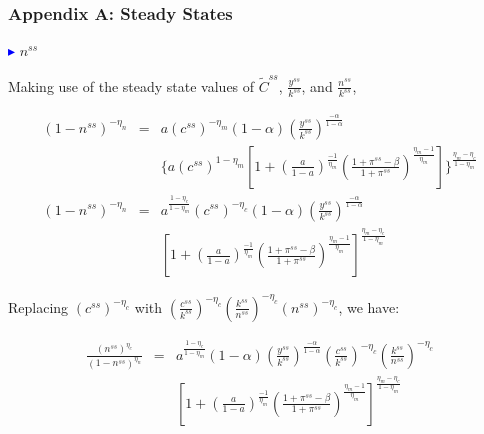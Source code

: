 \begin{frame}
\frametitle{Appendix A: Steady States} \vskip 0.1in

\textcolor{blue}{$\blacktriangleright$} $n^{ss}$\\

{\scriptsize{
Making use of the steady state values of
$\tilde{C}^{ss}$, $\frac{y^{ss}}{k^{ss}}$, and
$\frac{n^{ss}}{k^{ss}}$,


\begin{eqnarray}
(1-n^{ss})^{-\eta_{n}} &=& a
(c^{ss})^{-\eta_{m}}(1-\alpha)(\frac{y^{ss}}{k^{ss}})^{\frac{-\alpha}{1-\alpha}}
\nonumber\\&& \{a (c^{ss})^{1-\eta_{m}}[1+
(\frac{a}{1-a})^{\frac{-1}{\eta_{m}}}
(\frac{1+\pi^{ss}-\beta}{1+\pi^{ss}})^{\frac{\eta_{m}-1}{\eta_{m}}}]
\}^{\frac{\eta_{m}-\eta_{c}}{1-\eta_{m}}} \label{Eq5a.12}\\
(1-n^{ss})^{-\eta_{n}} &=& a^{\frac{1-\eta_{c}}{1-\eta_{m}}}
(c^{ss})^{-\eta_{c}}(1-\alpha)(\frac{y^{ss}}{k^{ss}})^{\frac{-\alpha}{1-\alpha}}
\nonumber\\&& [1+ (\frac{a}{1-a})^{\frac{-1}{\eta_{m}}}
(\frac{1+\pi^{ss}-\beta}{1+\pi^{ss}})^{\frac{\eta_{m}-1}{\eta_{m}}}]
^{\frac{\eta_{m}-\eta_{c}}{1-\eta_{m}}}\label{Eq5a.13}
\end{eqnarray}

Replacing $(c^{ss})^{-\eta_{c}}$ with
$(\frac{c^{ss}}{k^{ss}})^{-\eta_{c}}
(\frac{k^{ss}}{n^{ss}})^{-\eta_{c}} (n^{ss})^{-\eta_{c}}$, we have:

\begin{eqnarray}\label{Eq5a.14}
\frac{(n^{ss})^{\eta_{c}}}{(1-n^{ss})^{\eta_{n}}} &=&
a^{\frac{1-\eta_{c}}{1-\eta_{m}}}
(1-\alpha)(\frac{y^{ss}}{k^{ss}})^{\frac{-\alpha}{1-\alpha}}
(\frac{c^{ss}}{k^{ss}})^{-\eta_{c}}
(\frac{k^{ss}}{n^{ss}})^{-\eta_{c}} \nonumber\\&& [1+
(\frac{a}{1-a})^{\frac{-1}{\eta_{m}}}
(\frac{1+\pi^{ss}-\beta}{1+\pi^{ss}})^{\frac{\eta_{m}-1}{\eta_{m}}}]
^{\frac{\eta_{m}-\eta_{c}}{1-\eta_{m}}}
\end{eqnarray}
}}

\end{frame}
